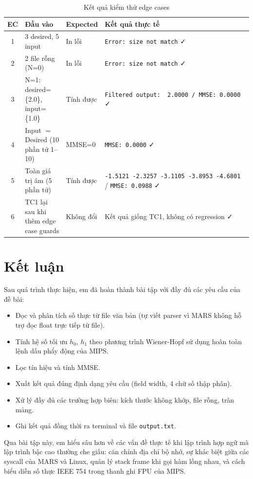 \documentclass[twoside,final]{hcmut-report}
\begin{document}
\begin{table}[H]
  \centering
  \caption{Kết quả kiểm thử edge cases}
  \label{tab:ec-results}
  \begin{tabularx}{\linewidth}{cllX}
    \toprule
    \textbf{EC} & \textbf{Đầu vào} & \textbf{Expected} & \textbf{Kết quả thực tế} \\
    \midrule
    1 & 3 desired, 5 input
      & In lỗi
      & \texttt{Error: size not match} ✓ \\
    2 & 2 file rỗng (N=0)
      & In lỗi
      & \texttt{Error: size not match} ✓ \\
    3 & N=1: desired=\{2.0\}, input=\{1.0\}
      & Tính được
      & \texttt{Filtered output:\ \ 2.0000 / MMSE: 0.0000} ✓ \\
    4 & Input $=$ Desired (10 phần tử 1--10)
      & MMSE=0
      & \texttt{MMSE: 0.0000} ✓ \\
    5 & Toàn giá trị âm (5 phần tử)
      & Tính được
      & \texttt{-1.5121\ -2.3257\ -3.1105\ -3.8953\ -4.6801} / \texttt{MMSE: 0.0988} ✓ \\
    6 & TC1 lại sau khi thêm edge case guards
      & Không đổi
      & Kết quả giống TC1, không có regression ✓ \\
    \bottomrule
  \end{tabularx}
\end{table}

\section{Kết luận}

Sau quá trình thực hiện, em đã hoàn thành bài tập với đầy đủ các
yêu cầu của đề bài:

\begin{itemize}
  \item Đọc và phân tích số thực từ file văn bản (tự viết parser vì MARS
        không hỗ trợ đọc float trực tiếp từ file).
  \item Tính hệ số tối ưu $h_0$, $h_1$ theo phương trình Wiener-Hopf
        sử dụng hoàn toàn lệnh dấu phẩy động của MIPS.
  \item Lọc tín hiệu và tính MMSE.
  \item Xuất kết quả đúng định dạng yêu cầu (field width, 4 chữ số thập phân).
  \item Xử lý đầy đủ các trường hợp biên: kích thước không khớp, file
        rỗng, tràn mảng.
  \item Ghi kết quả đồng thời ra terminal và file \texttt{output.txt}.
\end{itemize}

Qua bài tập này, em hiểu sâu hơn về các vấn đề thực tế khi lập trình
hợp ngữ mà lập trình bậc cao thường che giấu: căn chỉnh địa chỉ bộ nhớ,
sự khác biệt giữa các syscall của MARS và Linux, quản lý stack frame khi
gọi hàm lồng nhau, và cách biểu diễn số thực IEEE 754 trong thanh ghi
FPU của MIPS.
\end{document}
